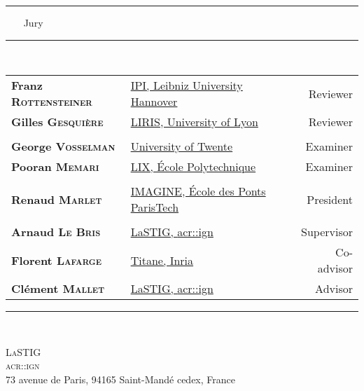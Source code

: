 \begin{titlepage}
\begin{center}
        \rule{.43\textwidth}{1pt} ~~~ {\Large Jury} ~~~ \rule{.43\textwidth}{1pt}\\
        \vspace*{1em}
        \begin{tabular}{l x{.5\textwidth} r}
            \textbf{Franz \textsc{Rottensteiner}} & \href{https://www.ipi.uni-hannover.de/en/rottensteiner/}{IPI, Leibniz University Hannover} & Reviewer \\
            \textbf{Gilles \textsc{Gesquière}} & \href{https://perso.liris.cnrs.fr/gilles.gesquiere/wiki/doku.php}{LIRIS, University of Lyon} & Reviewer \\
             & & \\
            \textbf{George \textsc{Vosselman}} & \href{https://research.utwente.nl/en/persons/george-vosselman}{University of Twente} & Examiner \\
            \textbf{Pooran \textsc{Memari}} & \href{http://www.lix.polytechnique.fr/~memari/}{LIX, \'Ecole Polytechnique} & Examiner \\
             & & \\
            \textbf{Renaud \textsc{Marlet}} & \href{http://imagine.enpc.fr/~marletr/}{IMAGINE, \'Ecole des Ponts ParisTech} & President \\
             & & \\
            \textbf{Arnaud \textsc{Le Bris}} & \href{http://recherche.ign.fr/labos/matis/~Le_Bris}{LaSTIG, \acrshort*{acr::ign}} & Supervisor \\
            \textbf{Florent \textsc{Lafarge}} & \href{https://www-sop.inria.fr/members/Florent.Lafarge/}{Titane, Inria} & Co-advisor \\
            \textbf{Clément \textsc{Mallet}} & \href{http://recherche.ign.fr/labos/matis/~mallet}{LaSTIG, \acrshort*{acr::ign}} & Advisor \\
        \end{tabular}
        \vspace*{1em}
        \rule{\textwidth}{1pt}\\

        \vfill

        \begin{minipage}{.75\textwidth}
            \centering
            \small
            \textsc{LaSTIG\\ \acrfull*{acr::ign}}\\
            73 avenue de Paris, 94165 Saint-Mandé cedex, France
        \end{minipage}
    \end{center}
\end{titlepage}

\emptypage
